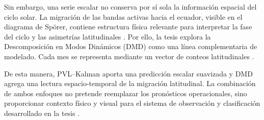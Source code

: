 Sin embargo, una serie escalar no conserva por sí sola la información espacial del ciclo solar. La migración de las bandas activas hacia el ecuador, visible en el diagrama de Spörer, contiene estructura física relevante para interpretar la fase del ciclo y las asimetrías latitudinales \citep{hathaway2015solarcycle,murakozy2022asymmetries}. Por ello, la tesis explora la Descomposición en Modos Dinámicos (DMD) como una línea complementaria de modelado. Cada mes se representa mediante un vector de conteos latitudinales \citep{schmid2010dmd,kutz2016dmd}.

De esta manera, PVL--Kalman aporta una predicción escalar suavizada y DMD agrega una lectura espacio-temporal de la migración latitudinal. La combinación de ambos enfoques no pretende reemplazar los pronósticos operacionales, sino proporcionar contexto físico y visual para el sistema de observación y clasificación desarrollado en la tesis \citep{podladchikova2012kalman,schmid2010dmd,kutz2016dmd}.
